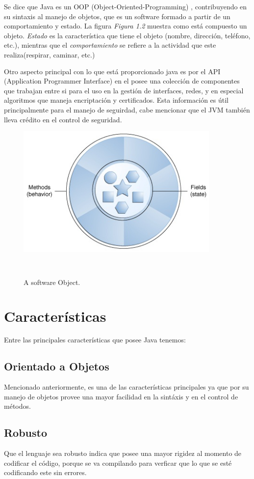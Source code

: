 \documentclass[12pt]{book} %
\begin{document}
Se dice que Java es un OOP (Object-Oriented-Programming) \cite{oop}, contribuyendo en su sintaxis al manejo de objetos, que es un software formado a partir de un comportamiento y estado. La figura \textsl{Figura 1.2} muestra como está compuesto un objeto. \textsl{Estado} es la característica que tiene el objeto (nombre, dirección, teléfono, etc.), mientras que el \textsl{comportamiento} se refiere a la actividad que este realiza(respirar, caminar, etc.)

Otro aspecto principal con lo que está proporcionado java es por el API (Application Programmer Interface) en el posee una colección de componentes que trabajan entre si para el uso en la gestión de interfaces, redes, y en especial algoritmos que maneja encriptación y certificados. Esta información es útil principalmente para el manejo de seguirdad, cabe mencionar que el JVM también lleva crédito en el control de seguridad.

\begin{figure}[h!]
		\centering
			\includegraphics[width=10cm]{conceptsobject.jpg}
			\caption{A software Object.}~\\[1.4cm]
		
\end{figure}


\chapter{Características}
Entre las principales características que posee Java tenemos:

\section{Orientado a Objetos}
Mencionado anteriormente, es una de las características principales ya que por su manejo de objetos provee una mayor facilidad en la sintáxis y en el control de métodos.
\section{Robusto}
Que el lenguaje sea robusto indica que posee una mayor rigidez al momento de codificar el código, porque se va compilando para verficar que lo que se esté codificando este sin errores.
\end{document}
